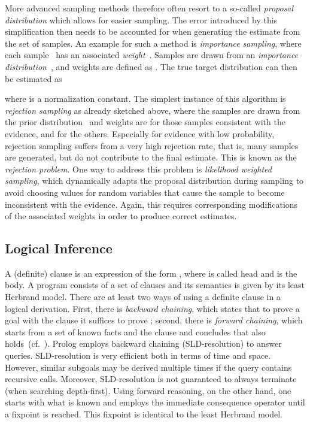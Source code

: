 \documentclass{tlp}
\begin{document}
More advanced sampling methods therefore often resort to a so-called
\emph{proposal distribution} which allows for easier sampling. The
error introduced by this simplification then needs to be accounted for
when generating the estimate from the set of samples.  An example for
such a method is \emph{importance sampling}, where each sample~
has an associated \emph{weight}~. Samples are drawn from an
\emph{importance distribution}~, and weights are
defined as . The true target
distribution can then be estimated as

where  is a normalization constant. The simplest
instance of this algorithm is \emph{rejection sampling} as already
sketched above, where the samples are drawn from the prior
distribution~ and weights are  for those samples
consistent with the evidence, and  for the others. Especially for
evidence with low probability, rejection sampling suffers from a very
high rejection rate, that is, many samples are generated, but do not
contribute to the final estimate. This is known as the \emph{rejection
  problem}. One way to address this problem is \emph{likelihood
  weighted sampling}, which dynamically adapts the proposal
distribution during sampling to avoid choosing values for random
variables that cause the sample to become inconsistent with the
evidence. Again, this requires corresponding modifications of the
associated weights in order to produce correct estimates.

\subsection{Logical Inference} 
\label{sec:forward}

A (definite) clause is an expression of the form , where  is called head and
 is the body.  A program consists of a set of
clauses and its semantics is given by its least Herbrand model.  There
are at least two ways of using a definite clause in a logical
derivation.  First, there is \emph{backward chaining}, which states
that to prove a goal  with the clause it suffices to prove
; second, there is \emph{forward chaining},
which starts from a set of known facts  and
the clause and concludes that  also
holds~(cf.~\cite{nilsson:book}).  Prolog employs backward chaining
(SLD-resolution) to answer queries.  SLD-resolution is very efficient
both in terms of time and space. However, similar subgoals may be
derived multiple times if the query contains recursive
calls. Moreover, SLD-resolution is not guaranteed to always terminate
(when searching depth-first).  Using forward reasoning, on the other
hand, one starts with what is known and employs the immediate
consequence operator  until a fixpoint is reached. This fixpoint
is identical to the least Herbrand model.
\end{document}
